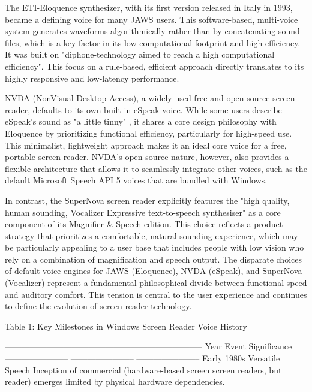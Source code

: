 The ETI-Eloquence synthesizer, with its first version released in Italy
in 1993, became a defining voice for many JAWS users.\supercite{5} This
software-based, multi-voice system generates waveforms algorithmically
rather than by concatenating sound files, which is a key factor in its
low computational footprint and high efficiency.\supercite{6} It was built on
"diphone-technology aimed to reach a high computational
efficiency".\supercite{5} This focus on a rule-based, efficient approach directly
translates to its highly responsive and low-latency performance.

NVDA (NonVisual Desktop Access), a widely used free and open-source
screen reader, defaults to its own built-in eSpeak voice.\supercite{8} While some
users describe eSpeak's sound as "a little tinny" \supercite{10}, it shares a
core design philosophy with Eloquence by prioritizing functional
efficiency, particularly for high-speed use.\supercite{11} This minimalist,
lightweight approach makes it an ideal core voice for a free, portable
screen reader.\supercite{9} NVDA's open-source nature, however, also provides a
flexible architecture that allows it to seamlessly integrate other
voices, such as the default Microsoft Speech API 5 voices that are
bundled with Windows.\supercite{10}

In contrast, the SuperNova screen reader explicitly features the "high
quality, human sounding, Vocalizer Expressive text-to-speech
synthesiser" as a core component of its Magnifier & Speech edition.\supercite{12}
This choice reflects a product strategy that prioritizes a comfortable,
natural-sounding experience, which may be particularly appealing to a
user base that includes people with low vision who rely on a combination
of magnification and speech output.\supercite{12} The disparate choices of default
voice engines for JAWS (Eloquence), NVDA (eSpeak), and SuperNova
(Vocalizer) represent a fundamental philosophical divide between
functional speed and auditory comfort. This tension is central to the
user experience and continues to define the evolution of screen reader
technology.

Table 1: Key Milestones in Windows Screen Reader Voice History

  -----------------------------------------------------------------------
  Year                    Event                   Significance
  ----------------------- ----------------------- -----------------------
  Early 1980s             Versatile Speech        Inception of commercial
                          (hardware-based screen  screen readers, but
                          reader) emerges         limited by physical
                                                  hardware dependencies.

